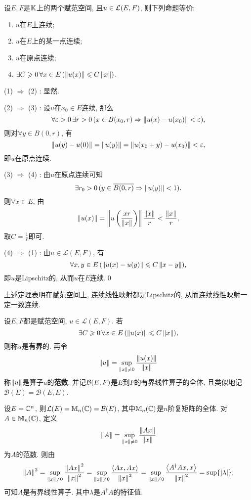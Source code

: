 	\begin{Theorem}[连续性]\label{thm:线性算子连续性}
	设$ E, F $是$ \mathbb{K} $上的两个赋范空间, 且$ u\in\mathcal{L}(E,F) $, 则下列命题等价:
	\begin{enumerate}[(1)]
	\item $ u $在$ E $上连续;
	\item $ u $在$ E $上的某一点连续;
	\item $ u $在原点连续;
	\item $ \exists C\geqslant 0\,\forall x\in E\,(\left\| u(x) \right\|\leqslant C\left\| x \right\|) $.
	\end{enumerate}
	\end{Theorem}
	\begin{Proof}
		(1) $ \Rightarrow $ (2) : 显然.
		
		(2) $ \Rightarrow $ (3) : 设$ u $在$ x_0\in E $连续, 那么
		\[
			\forall\varepsilon>0\,\exists r>0\,(x\in B(x_0,r)\Rightarrow\left\| u(x)-u(x_0) \right\|<\varepsilon),
		\]
		则对$ \forall y\in B(0,r) $, 有
		\[
			\left\| u(y)-u(0) \right\|=\left\| u(y) \right\|=\left\| u(x_0+y)-u(x_0) \right\|<\varepsilon,
		\]
		即$ u $在原点连续.
		
		(3) $ \Rightarrow $ (4) : 由$ u $在原点连续可知
		\[
			\exists r_0>0\,(y\in\overline{B(0,r)}\Rightarrow\left\| u(y) \right\|<1).
		\]
		则$ \forall x\in E $, 由
		\[
			\left\| u(x) \right\|=\left\| u\left(\dfrac{xr}{\left\| x \right\|}\right) \right\|\frac{\left\| x \right\|}{r}<\frac{\left\| x \right\|}{r},
		\]
		取$ C=\frac{1}{r} $即可.
		
		(4) $ \Rightarrow $ (1) : 由$ u\in\mathcal{L}(E,F) $, 有
		\[
			\forall x,y\in E\,(\left\| u(x)-u(y) \right\|\leqslant C\left\| x-y \right\|),
		\]
		即$ u $是Lipschitz的, 从而$ u $在$ E $连续.\qed
	\end{Proof}
	
	\begin{Remark}
		上述定理表明在赋范空间上, 连续线性映射都是Lipschitz的, 从而连续线性映射一定一致连续.
	\end{Remark}
	
	\begin{Definition}[算子范数]
		设$ E,F $都是赋范空间, $ u\in\mathcal{L}(E,F) $. 若
		\[
			\exists C\geqslant 0\,\forall x\in E\,(\left\| u(x) \right\|\leqslant C\left\| x \right\|),
		\]
		则称$ u $是\textbf{有界}的. 再令
		\[
			\left\| u \right\|=\sup_{\left\| x \right\|\ne 0}\frac{\left\| u(x) \right\|}{\left\| x \right\|}
		\]
		称$ \left\| u \right\| $是算子$ u $的\textbf{范数}. 并记$ \mathcal{B}(E,F) $是$ E $到$ F $的有界线性算子的全体, 且类似地记$ \mathcal{B}(E)=\mathcal{B}(E,E) $.
	\end{Definition}
	
	\begin{Example}
		设$ E=\mathbb{C}^n $, 则$ \mathcal{L}(E)=\mathbb{M}_n(\mathbb{C})=\mathcal{B}(E) $, 其中$ \mathbb{M}_n(\mathbb{C}) $是$ n $阶复矩阵的全体. 对$ A\in\mathbb{M}_n(\mathbb{C}) $, 定义
		\[
			\left\| A \right\|=\sup_{\left\| x \right\|\ne 0}\frac{\left\| Ax \right\|}{\left\| x \right\|}
		\]
		为$ A $的范数. 则由
		\[
			\left\| A \right\|^2=\sup_{\left\| x \right\|\ne 0}\frac{\left\| Ax \right\|^2}{\left\| x \right\|^2}=\sup_{\left\| x \right\|\ne 0}\frac{\left\langle Ax,Ax \right\rangle}{\left\| x \right\|^2}=\sup_{\left\| x \right\|\ne 0}\frac{\left\langle A^\dagger Ax,x \right\rangle}{\left\| x \right\|^2}=\sup\{\left| \lambda \right| \},
		\]
		可知$ A $是有界线性算子. 其中$ \lambda $是$ A^\dagger A $的特征值.
	\end{Example}
	
